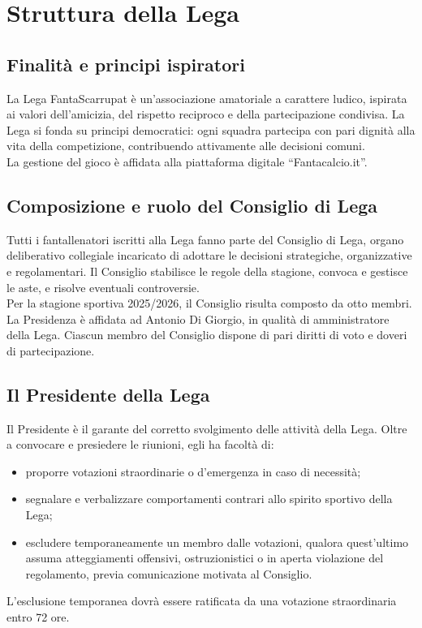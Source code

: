 \chapter{Struttura della Lega}
\label{cap:struttura-lega}

\section{Finalità e principi ispiratori}
\label{art:1.1}

La Lega FantaScarrupat è un’associazione amatoriale a carattere ludico, ispirata ai valori dell’amicizia, del rispetto reciproco e della partecipazione condivisa. La Lega si fonda su principi democratici: ogni squadra partecipa con pari dignità alla vita della competizione, contribuendo attivamente alle decisioni comuni.\\
La gestione del gioco è affidata alla piattaforma digitale “Fantacalcio.it”.

\section{Composizione e ruolo del Consiglio di Lega}
\label{art:1.2}

Tutti i fantallenatori iscritti alla Lega fanno parte del Consiglio di Lega, organo deliberativo collegiale incaricato di adottare le decisioni strategiche, organizzative e regolamentari. Il Consiglio stabilisce le regole della stagione, convoca e gestisce le aste, e risolve eventuali controversie.\\

Per la stagione sportiva 2025/2026, il Consiglio risulta composto da otto membri. La Presidenza è affidata ad Antonio Di Giorgio, in qualità di amministratore della Lega. Ciascun membro del Consiglio dispone di pari diritti di voto e doveri di partecipazione.

\section{Il Presidente della Lega}
\label{art:1.3}

Il Presidente è il garante del corretto svolgimento delle attività della Lega. Oltre a convocare e presiedere le riunioni, egli ha facoltà di:
\begin{itemize}
  \item proporre votazioni straordinarie o d’emergenza in caso di necessità;
  \item segnalare e verbalizzare comportamenti contrari allo spirito sportivo della Lega;
  \item escludere temporaneamente un membro dalle votazioni, qualora quest’ultimo assuma atteggiamenti offensivi, ostruzionistici o in aperta violazione del regolamento, previa comunicazione motivata al Consiglio.
\end{itemize}
\noindent
L'esclusione temporanea dovrà essere ratificata da una votazione straordinaria entro 72 ore.

